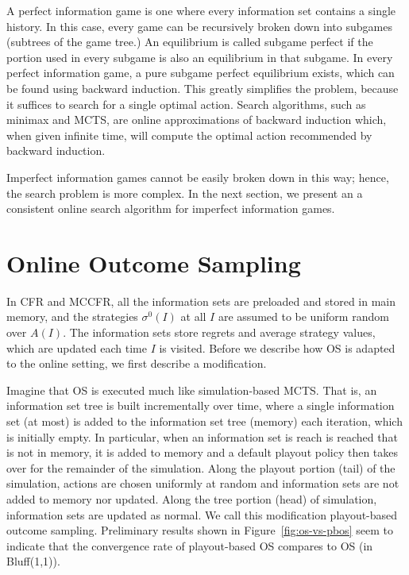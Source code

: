 \documentclass[letterpaper]{article}
\begin{document}
A perfect information game is one where every information set contains a single history. In this case, every game can be recursively broken down into 
subgames (subtrees of the game tree.) An equilibrium is called subgame perfect if the portion used in every subgame is also an equilibrium in that 
subgame. In every perfect information game, a pure subgame perfect equilibrium exists, which can be found using backward induction. 
This greatly simplifies the problem, because it suffices to search for a single optimal action. 
Search algorithms, such as minimax and MCTS, are online approximations of backward induction which, when given infinite time,
will compute the optimal action recommended by backward induction. 

Imperfect information games cannot be easily broken down in this way; hence, the search problem is more complex. In the next section, 
we present an a consistent online search algorithm for imperfect information games. 

\section{Online Outcome Sampling}


In CFR and MCCFR, all the information sets are preloaded and stored in main memory, and
the strategies $\sigma^0(I)$ at all $I$ are assumed to be uniform random over $A(I)$. The information sets store regrets and average strategy 
values, which are updated each time $I$ is visited. Before we describe how OS is adapted to the online setting, we first describe
a modification.

Imagine that OS is executed much like simulation-based MCTS. That is, an information set tree is built incrementally over 
time, where a single information set (at most) is added to the information set tree (memory) each iteration, which is initially empty. In 
particular, when an information set is reach is reached that is not in memory, it is added to memory and a default playout policy then takes 
over for the remainder of the simulation. Along the playout portion (tail) of the simulation, actions are chosen uniformly at random and 
information sets are not added to memory nor updated. Along the tree portion (head) of simulation, information sets are updated as normal. 
We call this modification playout-based outcome sampling. Preliminary results shown in Figure~\ref{fig:os-vs-pbos} seem to indicate that the convergence rate of playout-based OS compares to OS (in Bluff(1,1)).
\end{document}
